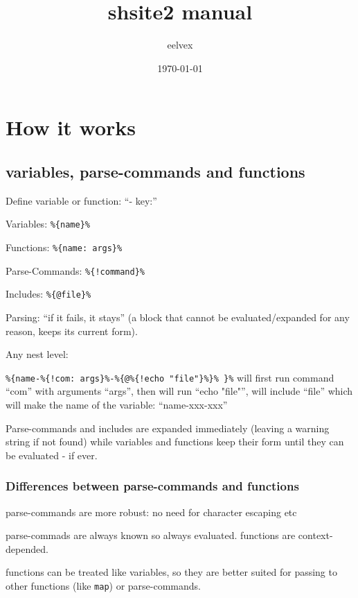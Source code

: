 \documentclass{memoir}
\title{shsite2 manual}
\author{eelvex}
\date{\today}
\newcommand{\var}[1]{\texttt{\%\{#1\}\%}}
\begin{document}
\begin{titlingpage}
\maketitle
\end{titlingpage}
\tableofcontents

\chapter{How it works} %

\section{variables, parse-commands and functions} %

	Define variable or function: ``- key:''

	Variables: \var{name}

	Functions: \var{name: args}

	Parse-Commands: \var{!command}

	Includes:  \var{@file}

	Parsing: ``if it fails, it stays'' (a block that cannot be evaluated/expanded for any reason, keeps its current form).

	Any nest level:

	\var{name-\var{!com: args}-\var{@\var{!echo "file"}} }
	will first run command ``com'' with arguments ``args'', then will run ``echo "file"'', will include ``file''
	which will make the name of the variable: ``name-xxx-xxx''

	Parse-commands and includes are expanded immediately (leaving a warning
	string if not found) while variables and functions keep their form
	until they can be evaluated - if ever.

	\subsection{Differences between parse-commands and functions} %
		parse-commands are more robust: no need for character escaping etc

		parse-commads are always known so always evaluated. functions are context-depended.

		functions can be treated like variables, so they are better
		suited for passing to other functions (like \texttt{map}) or parse-commands.


\end{document}
